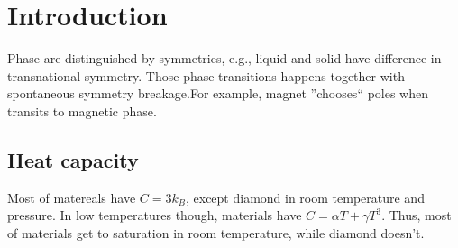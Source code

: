 \section{Introduction}
Phase are distinguished by symmetries, e.g., liquid and solid have difference in transnational symmetry. Those phase transitions happens together with spontaneous symmetry breakage.For example, magnet ''chooses`` poles when transits to magnetic phase.
\subsection{Heat capacity}
Most of matereals have $C=3k_B$, except diamond in room temperature and pressure. In low temperatures though, materials have $C=\alpha T + \gamma T^3$. Thus, most of materials get to saturation in room temperature, while diamond doesn't.